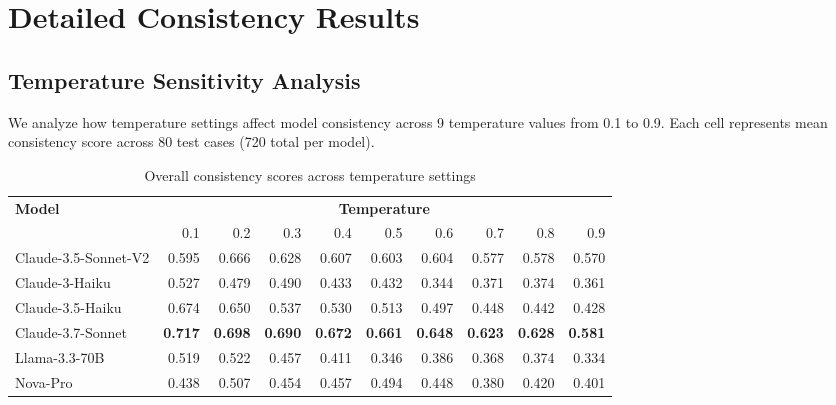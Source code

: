 \documentclass{article}
\begin{document}
\section{Detailed Consistency Results}

\subsection{Temperature Sensitivity Analysis}

We analyze how temperature settings affect model consistency across 9 temperature values from 0.1 to 0.9. Each cell represents mean consistency score across 80 test cases (720 total per model).

\begin{table}[H]
\centering
\caption{Overall consistency scores across temperature settings}
\label{tab:overall-consistency-temp}
\begin{tabular}{lrrrrrrrrr}
\toprule
\textbf{Model} & \multicolumn{9}{c}{\textbf{Temperature}} \\
\cmidrule{2-10}
 & 0.1 & 0.2 & 0.3 & 0.4 & 0.5 & 0.6 & 0.7 & 0.8 & 0.9 \\
\midrule
Claude-3.5-Sonnet-V2 & 0.595 & 0.666 & 0.628 & 0.607 & 0.603 & 0.604 & 0.577 & 0.578 & 0.570 \\
Claude-3-Haiku & 0.527 & 0.479 & 0.490 & 0.433 & 0.432 & 0.344 & 0.371 & 0.374 & 0.361 \\
Claude-3.5-Haiku & 0.674 & 0.650 & 0.537 & 0.530 & 0.513 & 0.497 & 0.448 & 0.442 & 0.428 \\
Claude-3.7-Sonnet & \textbf{0.717} & \textbf{0.698} & \textbf{0.690} & \textbf{0.672} & \textbf{0.661} & \textbf{0.648} & \textbf{0.623} & \textbf{0.628} & \textbf{0.581} \\
Llama-3.3-70B & 0.519 & 0.522 & 0.457 & 0.411 & 0.346 & 0.386 & 0.368 & 0.374 & 0.334 \\
Nova-Pro & 0.438 & 0.507 & 0.454 & 0.457 & 0.494 & 0.448 & 0.380 & 0.420 & 0.401 \\
\bottomrule
\end{tabular}
\end{table}
\end{document}
